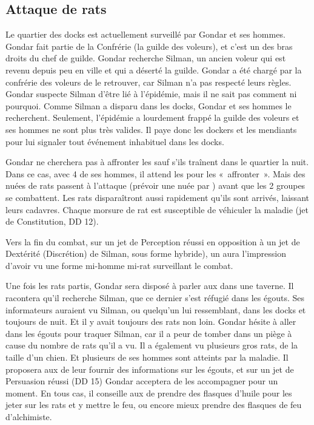 \documentclass[a4paper,10pt,openany]{book}
\begin{document}
\begin{multicols}{2}
\subsection{Attaque de rats}
Le quartier des docks est actuellement surveillé par Gondar et ses hommes. Gondar fait partie de la Confrérie (la guilde des voleurs), et c’est un des
bras droits du chef de guilde. Gondar recherche Silman, un ancien voleur qui est revenu depuis peu en ville et qui a déserté la guilde. Gondar a été
chargé par la confrérie des voleurs de le retrouver, car Silman n’a pas respecté leurs règles. Gondar suspecte Silman d’être lié à l’épidémie, mais il
ne sait pas comment ni pourquoi. Comme Silman a disparu dans les docks, Gondar et ses hommes le recherchent. Seulement, l’épidémie a lourdement frappé
la guilde des voleurs et ses hommes ne sont plus très valides. Il paye donc les dockers et les mendiants pour lui signaler tout événement inhabituel
dans les docks.\par Gondar ne cherchera pas à affronter les \PJs sauf s’ils traînent dans le quartier la nuit. Dans ce cas, avec 4 de ses hommes, il
attend les \PJs pour les « affronter ». Mais des nuées de rats passent à l’attaque (prévoir une nuée par \PJ) avant que les 2 groupes se combattent.
Les rats disparaîtront aussi rapidement qu’ils sont arrivés, laissant leurs cadavres. Chaque morsure de rat est susceptible de véhiculer la maladie
(jet de Constitution, DD 12).\par Vers la fin du combat, sur un jet de Perception réussi en opposition à un jet de Dextérité (Discrétion) de Silman,
sous forme hybride), un \PJ aura l’impression d’avoir vu une forme mi-homme mi-rat surveillant le combat.\par  Une fois les rats partis, Gondar sera
disposé à parler aux \PJs dans une taverne. Il racontera qu’il recherche Silman, que ce dernier s’est réfugié dans les égouts. Ses informateurs
auraient vu Silman, ou quelqu’un lui ressemblant, dans les docks et toujours de nuit. Et il y avait toujours des rats non loin. Gondar hésite à aller
dans les égouts pour traquer Silman, car il a peur de tomber dans un piège à cause du nombre de rats qu’il a vu. Il a également vu plusieurs gros
rats, de la taille d’un chien. Et plusieurs de ses hommes sont atteints par la maladie. Il proposera aux \PJs de leur fournir des informations sur les
égouts, et sur un jet de Persuasion réussi (DD 15) Gondar acceptera de les accompagner pour un moment. En tous cas, il conseille aux \PJs de prendre
des flasques d’huile pour les jeter sur les rats et y mettre le feu, ou encore mieux prendre des flasques de feu d’alchimiste.


\end{multicols}
\end{document}
